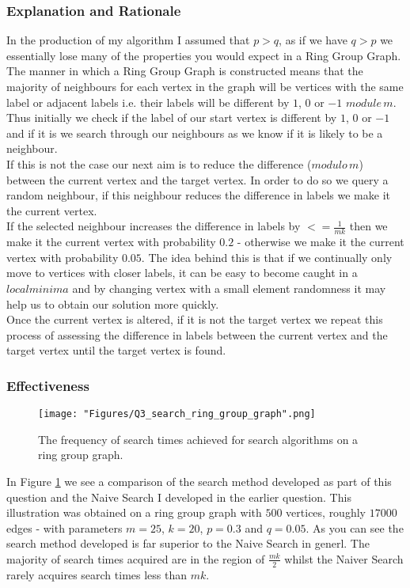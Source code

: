 \documentclass[12pt, a4paper]{article}
\begin{document}
\subsubsection*{Explanation and Rationale}
In the production of my algorithm I assumed that $p>q$, as if we have $q>p$ we essentially lose many of the properties you would expect in a Ring Group Graph.\\
The manner in which a Ring Group Graph is constructed means that the majority of neighbours for each vertex in the graph will be vertices with the same label or adjacent labels i.e. their labels will be different by $1$, $0$ or $-1$ $module \, m$.\\
Thus initially we check if the label of our start vertex is different by $1$, $0$ or $-1$ and if it is we search through our neighbours as we know if it is likely to be a neighbour.\\
If this is not the case our next aim is to reduce the difference ($modulo \, m$) between the current vertex and the target vertex. In order to do so we query a random neighbour, if this neighbour reduces the difference in labels we make it the current vertex.\\
If the selected neighbour increases the difference in labels by $<= \frac{1}{mk}$ then we make it the current vertex with probability $0.2$ - otherwise we make it the current vertex with probability $0.05$. The idea behind this is that if we continually only move to vertices with closer labels, it can be easy to become caught in a $local minima$ and by changing vertex with a small element randomness it may help us to obtain our solution more quickly.\\
Once the current vertex is altered, if it is not the target vertex we repeat this process of assessing the difference in labels between the current vertex and the target vertex until the target vertex is found.

\subsubsection*{Effectiveness}
 \begin{figure}[!htb]
     \centering
     \texttt{[image: "Figures/Q3\_search\_ring\_group\_graph".png]}
     \caption{The frequency of search times achieved for search algorithms on a ring group graph.}
     \label{Fig:search_ring_ group_graph}
\end{figure}
In Figure \ref{Fig:search_ring_ group_graph} we see a comparison of the search method developed as part of this question and the Naive Search I developed in the earlier question. This illustration was obtained on a ring group graph with $500$ vertices, roughly $17000$ edges - with parameters $m = 25$, $k=20$, $p=0.3$ and $q=0.05$. As you can see the search method developed is far superior to the Naive Search in generl. The majority of search times acquired are in the region of $\frac{mk}{2}$ whilst the Naiver Search rarely acquires search times less than $mk$. 
\end{document}
